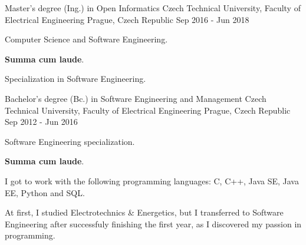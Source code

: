 \begin{cventries}
  \cventry
    {Master's degree (Ing.) in Open Informatics}
    {Czech Technical University, Faculty of Electrical Engineering}
    {Prague, Czech Republic}
    {Sep 2016 - Jun 2018}
    {
      \begin{cvitems}
        \item {Computer Science and Software Engineering.}
        \item {\textbf{Summa cum laude}.}
        \item {Specialization in Software Engineering.}
      \end{cvitems}
    }

  \cventry
    {Bachelor's degree (Bc.) in Software Engineering and Management}
    {Czech Technical University, Faculty of Electrical Engineering}
    {Prague, Czech Republic}
    {Sep 2012 - Jun 2016}
    {
      \begin{cvitems}
        \item {Software Engineering specialization.}
        \item {\textbf{Summa cum laude}.}
        \item {I got to work with the following programming languages: C, C++, Java SE, Java EE, Python and SQL.}
        \item {At first, I studied Electrotechnics \& Energetics, but I transferred to Software Engineering after successfuly finishing the first year, as I discovered my passion in programming.}
      \end{cvitems}
    }
\end{cventries}
